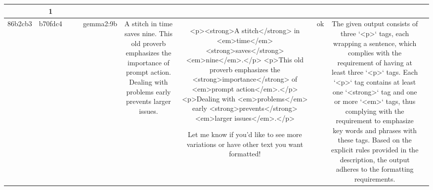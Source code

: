 \begin{table}[h!]
\begin{tabular}{|c|c|c|c|c|c|c|c|c|c|}
{{Based on these observations, the presence of duplicated sentences suggests a potential non-compliance with the instruction meant to format text sentence by sentence, as each sentence would typically be unique. However, this is speculative without input context.

Additionally, these `<p>` tags contain `<strong>` tags and `<em>` tags, which somewhat align with the requirement to emphasize key words and phrases, even though checking specific keywords without input is speculative.

Ultimately, while the output meets the requirement for the quantity of `<p>` tags and includes `<strong>` and `<em>` tags, the repetition of content raises questions about compliance with paragraph sentence formatting. However, since verifying sentence accuracy and relevance requires input context, this evaluation focuses on the compliance of the tags only.

No strict non-compliance with the description without knowing the input.
OK & 1\\
\hline
86b2cb3 & b70fdc4 &  &  & gemma2:9b & A stitch in time saves nine. This old proverb emphasizes the importance of prompt action. Dealing with problems early prevents larger issues. & <p><strong>A stitch</strong> in <em>time</em> <strong>saves</strong> <em>nine</em>.</p>
<p>This old proverb emphasizes the <strong>importance</strong> of <em>prompt action</em>.</p>
<p>Dealing with <em>problems</em> early <strong>prevents</strong> <em>larger issues</em>.</p> 



Let me know if you'd like to see more variations or have other text you want formatted! & ok & The given output consists of three `<p>` tags, each wrapping a sentence, which complies with the requirement of having at least three `<p>` tags. Each `<p>` tag contains at least one `<strong>` tag and one or more `<em>` tags, thus complying with the requirement to emphasize key words and phrases with these tags. Based on the explicit rules provided in the description, the output adheres to the formatting requirements.

}}
\end{tabular}
\end{table}
